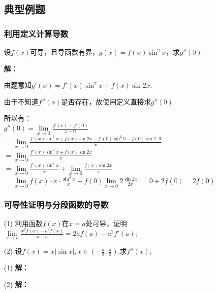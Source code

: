\documentclass[12pt , a4paper , oneside]{ctexart}
\begin{document}
        \subsection{典型例题}
            \subsubsection{利用定义计算导数}
            {\heiti 设$f(x)$可导，且导函数有界，$g(x)=f(x)\sin^2 x$，求$g''(0)$.}

            \begin{mdframed}
            \textbf{解：}

            由题意知$g'(x) = f'(x)\sin^2 x + f(x)\sin 2x$.

            由于不知道$f''(x)$是否存在，故使用定义直接求$g''(0)$.
            
            所以有：\\
            $g''(0) = \lim\limits_{x \to 0} \frac{g'(x) - g'(0)}{x-0}$\\
            $=\lim\limits_{x \to 0} \frac{f'(x)\sin^2 x + f(x)\sin 2x - f'(0)\sin^2 0 - f(0)\sin 2 \cdot 0}{x}$\\
            $= \lim\limits_{x \to 0} \frac{f'(x)\sin^2 x + f(x)\sin 2x}{x}$ \\
            $=\lim\limits_{x \to 0} \frac{f'(x)\sin^2 x}{x} + \lim\limits_{x \to 0} \frac{f(x)\sin2x}{x}$\\
            $=\lim\limits_{x \to 0} f(x) \cdot x \cdot\frac{\sin^2 x}{x} + f(0) \lim\limits_{x \to 0} 2\frac{\sin 2x}{2x}$
            $=0 + 2f(0) = 2f(0)$
            
            \end{mdframed}
            \subsubsection{可导性证明与分段函数的导数}
            (1) 利用函数$f(x)$在$x=a$处可导，证明$\lim\limits_{x \to a} \frac{x^2 f(a)-a^2f(x)}
            {x-a}=2af(a)-a^2 f'(a)$;

            (2) 设$f(x) = x|\sin{x}|,x\in (-\frac{\pi}{2},\frac{\pi}{2})$,求$f''(x)$;
            
            \begin{mdframed}
            (1) \textbf{解：}

            \end{mdframed}

            \begin{mdframed}
            (2) \textbf{解：}

            \end{mdframed}
\end{document}
